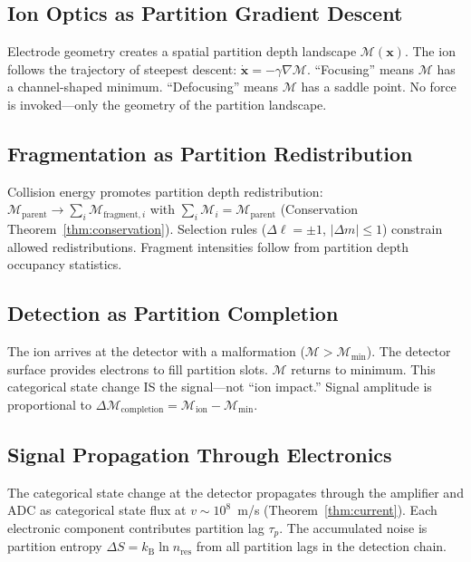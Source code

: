 \documentclass[11pt,twocolumn,a4paper]{article}
\theoremstyle{definition}
\theoremstyle{remark}
\newcommand{\kB}{k_{\mathrm{B}}}
\newcommand{\Depth}{\mathcal{M}}
\newcommand{\taup}{\tau_p}
\begin{document}
\subsection{Ion Optics as Partition Gradient Descent}

Electrode geometry creates a spatial partition depth landscape $\Depth(\mathbf{x})$. The ion follows the trajectory of steepest descent: $\dot{\mathbf{x}} = -\gamma\nabla\Depth$. ``Focusing'' means $\Depth$ has a channel-shaped minimum. ``Defocusing'' means $\Depth$ has a saddle point. No force is invoked---only the geometry of the partition landscape.

\subsection{Fragmentation as Partition Redistribution}

Collision energy promotes partition depth redistribution: $\Depth_{\mathrm{parent}} \to \sum_i \Depth_{\mathrm{fragment},i}$ with $\sum_i \Depth_i = \Depth_{\mathrm{parent}}$ (Conservation Theorem~\ref{thm:conservation}). Selection rules ($\Delta\ell = \pm 1$, $|\Delta m| \leq 1$) constrain allowed redistributions. Fragment intensities follow from partition depth occupancy statistics.

\subsection{Detection as Partition Completion}

The ion arrives at the detector with a malformation ($\Depth > \Depth_{\min}$). The detector surface provides electrons to fill partition slots. $\Depth$ returns to minimum. This categorical state change IS the signal---not ``ion impact.'' Signal amplitude is proportional to $\Delta\Depth_{\mathrm{completion}} = \Depth_{\mathrm{ion}} - \Depth_{\min}$.

\subsection{Signal Propagation Through Electronics}

The categorical state change at the detector propagates through the amplifier and ADC as categorical state flux at $v \sim 10^8$~m/s (Theorem~\ref{thm:current}). Each electronic component contributes partition lag $\taup$. The accumulated noise is partition entropy $\Delta S = \kB\ln n_{\mathrm{res}}$ from all partition lags in the detection chain.
\end{document}
